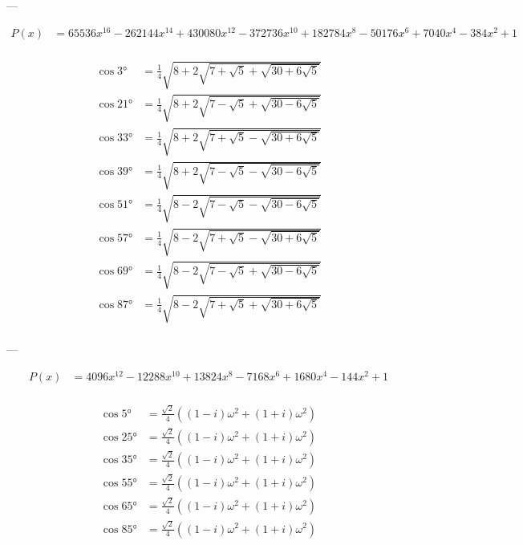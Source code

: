 ---

$$
\begin{aligned}
    P(x) &= 65536 x^{16}-262144 x^{14}+430080 x^{12}-372736 x^{10}+182784 x^8-50176 x^6+7040 x^4-384 x^2+1\\
\end{aligned}
$$

$$
\begin{aligned}
    \cos 3°  &= \frac{1}{4} \sqrt{8+2\sqrt{7+\sqrt{5}+\sqrt{30+6\sqrt{5}}}}\\
    \cos 21° &= \frac{1}{4} \sqrt{8+2\sqrt{7-\sqrt{5}+\sqrt{30-6\sqrt{5}}}}\\
    \cos 33° &= \frac{1}{4} \sqrt{8+2\sqrt{7+\sqrt{5}-\sqrt{30+6\sqrt{5}}}}\\
    \cos 39° &= \frac{1}{4} \sqrt{8+2\sqrt{7-\sqrt{5}-\sqrt{30-6\sqrt{5}}}}\\
    \cos 51° &= \frac{1}{4} \sqrt{8-2\sqrt{7-\sqrt{5}-\sqrt{30-6\sqrt{5}}}}\\
    \cos 57° &= \frac{1}{4} \sqrt{8-2\sqrt{7+\sqrt{5}-\sqrt{30+6\sqrt{5}}}}\\
    \cos 69° &= \frac{1}{4} \sqrt{8-2\sqrt{7-\sqrt{5}+\sqrt{30-6\sqrt{5}}}}\\
    \cos 87° &= \frac{1}{4} \sqrt{8-2\sqrt{7+\sqrt{5}+\sqrt{30+6\sqrt{5}}}}\\
\end{aligned}
$$


---

$$
\begin{aligned}
    P(x) &= 4096 x^{12}-12288 x^{10}+13824 x^8-7168 x^6+1680 x^4-144 x^2+1\\
\end{aligned}
$$

$$
\begin{aligned}
    \cos 5°  &= \frac{\sqrt{2}}{4} \left((1-i)\omega^2+(1+i)\omega^2\right)\\
    \cos 25° &= \frac{\sqrt{2}}{4} \left((1-i)\omega^2+(1+i)\omega^2\right)\\
    \cos 35° &= \frac{\sqrt{2}}{4} \left((1-i)\omega^2+(1+i)\omega^2\right)\\
    \cos 55° &= \frac{\sqrt{2}}{4} \left((1-i)\omega^2+(1+i)\omega^2\right)\\
    \cos 65° &= \frac{\sqrt{2}}{4} \left((1-i)\omega^2+(1+i)\omega^2\right)\\
    \cos 85° &= \frac{\sqrt{2}}{4} \left((1-i)\omega^2+(1+i)\omega^2\right)\\
\end{aligned}
$$
